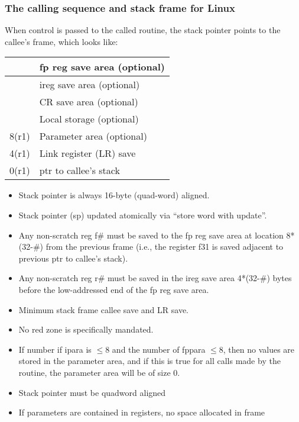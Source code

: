 \documentclass[11pt]{article}
\begin{document}
\subsubsection{The calling sequence and stack frame for Linux}
When control is passed to the called routine, the stack pointer points to
the callee's frame, which looks like:
\begin{center}
\begin{tabular}{l|l}
       & fp reg save area (optional) \\\hline
       & ireg save area (optional) \\\hline
       & CR save area (optional) \\\hline
       & Local storage (optional) \\\hline
 8(r1) & Parameter area (optional) \\\hline
 4(r1) & Link register (LR) save \\\hline
 0(r1) & ptr to callee's stack \\\hline
\end{tabular}

\begin{itemize}
\item Stack pointer is always 16-byte (quad-word) aligned.
\item Stack pointer (sp) updated atomically via ``store word with update''.
\item Any non-scratch reg f\# must be saved to the fp reg save area at location
      8*(32-\#) from the previous frame (i.e., the register f31 is saved
      adjacent to previous ptr to callee's stack).
\item Any non-scratch reg r\# must be saved in the ireg save area 4*(32-\#)
      bytes before the low-addressed end of the fp reg save area.
\item Minimum stack frame callee save and LR save.
\item No red zone is specifically mandated.
\item If number if ipara is $\leq 8$ and the number of fppara $\leq 8$, then
      no values are stored in the parameter area, and if this is true for
      all calls made by the routine, the parameter area will be of size 0.
\end{itemize}
\end{center}

\begin{itemize}
\item Stack pointer must be quadword aligned
\item If parameters are contained in registers, no space allocated in frame
\end{itemize}
\end{document}
